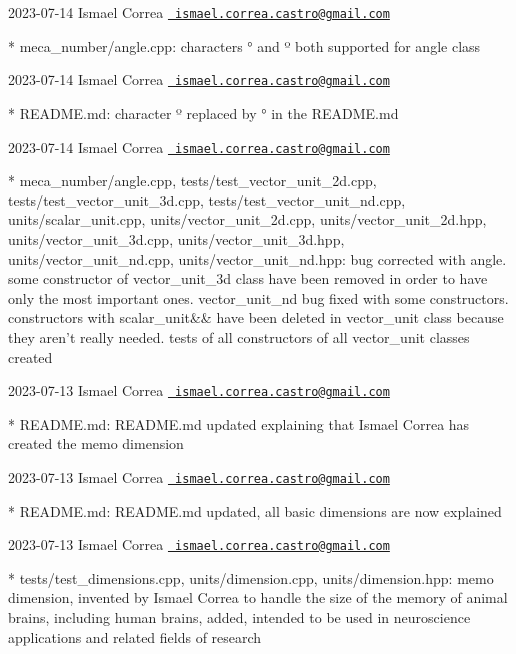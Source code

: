  2023-\/07-\/14 Ismael Correa \href{mailto:ismael.correa.castro@gmail.com}{\texttt{ ismael.\+correa.\+castro@gmail.\+com}} \begin{DoxyVerb}* meca_number/angle.cpp: characters ° and º both supported for
angle class
\end{DoxyVerb}
 2023-\/07-\/14 Ismael Correa \href{mailto:ismael.correa.castro@gmail.com}{\texttt{ ismael.\+correa.\+castro@gmail.\+com}} \begin{DoxyVerb}* README.md: character º replaced by ° in the README.md
\end{DoxyVerb}
 2023-\/07-\/14 Ismael Correa \href{mailto:ismael.correa.castro@gmail.com}{\texttt{ ismael.\+correa.\+castro@gmail.\+com}} \begin{DoxyVerb}* meca_number/angle.cpp, tests/test_vector_unit_2d.cpp,
tests/test_vector_unit_3d.cpp, tests/test_vector_unit_nd.cpp,
units/scalar_unit.cpp, units/vector_unit_2d.cpp,
units/vector_unit_2d.hpp, units/vector_unit_3d.cpp,
units/vector_unit_3d.hpp, units/vector_unit_nd.cpp,
units/vector_unit_nd.hpp: bug corrected with angle. some constructor
of vector_unit_3d class have been removed in order to have only the
most important ones. vector_unit_nd bug fixed with some
constructors. constructors with scalar_unit&& have been deleted in
vector_unit class because they aren't really needed. tests of all
constructors of all vector_unit classes created
\end{DoxyVerb}
 2023-\/07-\/13 Ismael Correa \href{mailto:ismael.correa.castro@gmail.com}{\texttt{ ismael.\+correa.\+castro@gmail.\+com}} \begin{DoxyVerb}* README.md: README.md updated explaining that Ismael Correa has
created the memo dimension
\end{DoxyVerb}
 2023-\/07-\/13 Ismael Correa \href{mailto:ismael.correa.castro@gmail.com}{\texttt{ ismael.\+correa.\+castro@gmail.\+com}} \begin{DoxyVerb}* README.md: README.md updated, all basic dimensions are now
explained
\end{DoxyVerb}
 2023-\/07-\/13 Ismael Correa \href{mailto:ismael.correa.castro@gmail.com}{\texttt{ ismael.\+correa.\+castro@gmail.\+com}} \begin{DoxyVerb}* tests/test_dimensions.cpp, units/dimension.cpp,
units/dimension.hpp: memo dimension, invented by Ismael Correa to
handle the size of the memory of animal brains, including human
brains, added, intended to be used in neuroscience applications and
related fields of research
\end{DoxyVerb}
